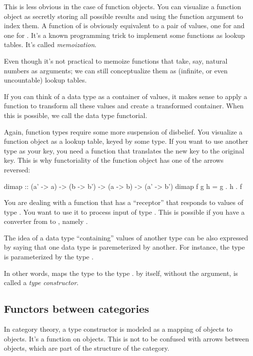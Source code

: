 \documentclass[DaoFP]{subfiles}
\begin{document}
This is less obvious in the case of function objects. You can visualize a function object as secretly storing all possible results and using the function argument to index them. A function of  is obviously equivalent to a pair of values, one for  and one for . It's a known programming trick to implement some functions as lookup tables. It's called \emph{memoization}. 

Even though it's not practical to memoize functions that take, say, natural numbers as arguments; we can still conceptualize them as (infinite, or even uncountable) lookup tables.

If you can think of a data type as a container of values, it makes sense to apply a function to transform all these values and create a transformed container. When this is possible, we call the data type functorial. 

Again, function types require some more suspension of disbelief. You visualize a function object as a lookup table, keyed by some type. If you want to use another type as your key, you need a function that translates the new key to the original key. This is why functoriality of the function object has one of the arrows reversed:
\begin{haskell}
dimap :: (a' -> a) -> (b -> b') -> (a -> b) -> (a' -> b')
dimap f g h = g . h . f
\end{haskell}
You are dealing with a function  that has a ``receptor'' that responds to values of type . You want to use it to process input of type . This is possible if you have a converter from  to , namely .


The idea of a data type ``containing'' values of another type can be also expressed by saying that one data type is paremeterized by another. For instance, the type  is parameterized by the type . 

In other words,  maps the type  to the type .  by itself, without the argument, is called a \emph{type constructor}. 

\subsection{Functors between categories}
In category theory, a type constructor is modeled as a mapping of objects to objects. It's a function on objects. This is not to be confused with arrows between objects, which are part of the structure of the category. 
\end{document}
